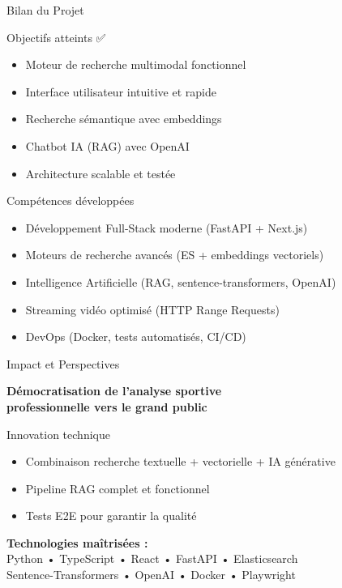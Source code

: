 \documentclass[11pt]{beamer}
\begin{document}
\begin{frame}{Bilan du Projet}
\begin{block}{Objectifs atteints ✅}
\begin{itemize}
    \item[$\checkmark$] Moteur de recherche multimodal fonctionnel
    \item[$\checkmark$] Interface utilisateur intuitive et rapide
    \item[$\checkmark$] Recherche sémantique avec embeddings
    \item[$\checkmark$] Chatbot IA (RAG) avec OpenAI
    \item[$\checkmark$] Architecture scalable et testée
\end{itemize}
\end{block}

\vspace{0.3cm}

\begin{block}{Compétences développées}
\begin{itemize}
    \item Développement Full-Stack moderne (FastAPI + Next.js)
    \item Moteurs de recherche avancés (ES + embeddings vectoriels)
    \item Intelligence Artificielle (RAG, sentence-transformers, OpenAI)
    \item Streaming vidéo optimisé (HTTP Range Requests)
    \item DevOps (Docker, tests automatisés, CI/CD)
\end{itemize}
\end{block}
\end{frame}

\begin{frame}{Impact et Perspectives}
\begin{center}
\Large{\textbf{Démocratisation de l'analyse sportive\\professionnelle vers le grand public}}
\end{center}

\vspace{0.5cm}

\begin{block}{Innovation technique}
\begin{itemize}
    \item Combinaison recherche textuelle + vectorielle + IA générative
    \item Pipeline RAG complet et fonctionnel
    \item Tests E2E pour garantir la qualité
\end{itemize}
\end{block}

\vspace{0.3cm}

\begin{center}
\textbf{Technologies maîtrisées :}\\
Python • TypeScript • React • FastAPI • Elasticsearch\\
Sentence-Transformers • OpenAI • Docker • Playwright
\end{center}
\end{frame}
\end{document}

